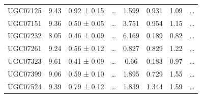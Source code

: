 \documentclass[reprint,%
 amsmath,amssymb,
 aps,
]{revtex4-1}
\begin{document}
\begin{table}[]
\begin{tabular}{cccccrrc}
\rowcolor[HTML]{F3F3F3} 
UGC07125             & 9.43                      & 0.92 ± 0.15           & …                      & 1.599                                                        & 0.931                                                         & 1.09                                                            & …                                                             \\
\rowcolor[HTML]{F3F3F3} 
UGC07151             & 9.36                      & 0.50 ± 0.05           & …                      & 3.751                                                        & 0.954                                                          & 1.15                                                            & …                                                             \\
\rowcolor[HTML]{F3F3F3} 
UGC07232             & 8.05                      & 0.46 ± 0.09           & …                      & 6.169                                                        & 0.189                                                          & 0.82                                                          & …                                                             \\
\rowcolor[HTML]{F3F3F3} 
UGC07261             & 9.24                      & 0.56 ± 0.12           & …                      & 0.827                                                        & 0.829                                                         & 1.22                                                           & …                                                             \\
\rowcolor[HTML]{F3F3F3} 
UGC07323             & 9.61                      & 0.41 ± 0.09           & …                      & 0.66                                                         & 0.183                                                          & 0.97                                                          & …                                                             \\
\rowcolor[HTML]{F3F3F3} 
UGC07399             & 9.06                      & 0.59 ± 0.10           & …                      & 1.895                                                        & 0.729                                                           & 1.55                                                           & …                                                             \\
\rowcolor[HTML]{F3F3F3} 
UGC07524             & 9.39                      & 0.79 ± 0.12           & …                      & 1.839                                                        & 1.344                                                          & 1.59                                                          & …                                                             \\

\end{tabular}
\end{table}
\end{document}
